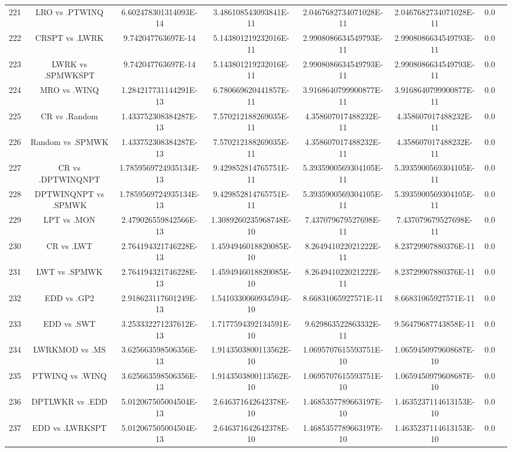 \documentclass[a3paper,10pt]{article}
\begin{document}
\begin{table}[!htp]
\begin{tabular}{cccccccc}
221&LRO vs .PTWINQ&6.602478301314093E-14&3.486108543093841E-11&2.0467682734071028E-11&2.0467682734071028E-11&0.0\\
222&CRSPT vs .LWRK&9.742047763697E-14&5.143801219232016E-11&2.9908086634549793E-11&2.9908086634549793E-11&0.0\\
223&LWRK vs .SPMWKSPT&9.742047763697E-14&5.143801219232016E-11&2.9908086634549793E-11&2.9908086634549793E-11&0.0\\
224&MRO vs .WINQ&1.284217731144291E-13&6.780669620441857E-11&3.9168640799900877E-11&3.9168640799900877E-11&0.0\\
225&CR vs .Random&1.433752308384287E-13&7.570212188269035E-11&4.358607017488232E-11&4.358607017488232E-11&0.0\\
226&Random vs .SPMWK&1.433752308384287E-13&7.570212188269035E-11&4.358607017488232E-11&4.358607017488232E-11&0.0\\
227&CR vs .DPTWINQNPT&1.7859569724935134E-13&9.429852814765751E-11&5.3935900569304105E-11&5.3935900569304105E-11&0.0\\
228&DPTWINQNPT vs .SPMWK&1.7859569724935134E-13&9.429852814765751E-11&5.3935900569304105E-11&5.3935900569304105E-11&0.0\\
229&LPT vs .MON&2.479026559842566E-13&1.3089260235968748E-10&7.437079679527698E-11&7.437079679527698E-11&0.0\\
230&CR vs .LWT&2.764194321746228E-13&1.4594946018820085E-10&8.264941022021222E-11&8.23729907880376E-11&0.0\\
231&LWT vs .SPMWK&2.764194321746228E-13&1.4594946018820085E-10&8.264941022021222E-11&8.23729907880376E-11&0.0\\
232&EDD vs .GP2&2.918623117601249E-13&1.5410330060934594E-10&8.66831065927571E-11&8.66831065927571E-11&0.0\\
233&EDD vs .SWT&3.253332271237612E-13&1.7177594392134591E-10&9.629863522863332E-11&9.56479687743858E-11&0.0\\
234&LWRKMOD vs .MS&3.625663598506356E-13&1.9143503800113562E-10&1.0695707615593751E-10&1.0659450979608687E-10&0.0\\
235&PTWINQ vs .WINQ&3.625663598506356E-13&1.9143503800113562E-10&1.0695707615593751E-10&1.0659450979608687E-10&0.0\\
236&DPTLWKR vs .EDD&5.012067505004504E-13&2.646371642642378E-10&1.4685357789663197E-10&1.4635237114613153E-10&0.0\\
237&EDD vs .LWRKSPT&5.012067505004504E-13&2.646371642642378E-10&1.4685357789663197E-10&1.4635237114613153E-10&0.0\\

\end{tabular}
\end{table}
\end{document}
